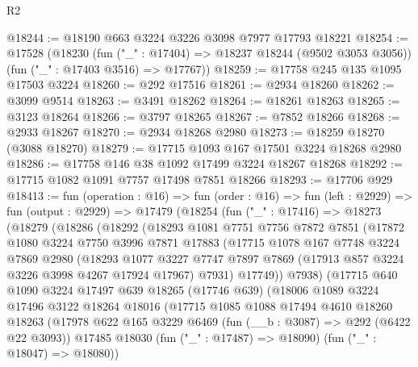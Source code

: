 \begin{lexlean}{R2}
\begin{coremodule}
@18244 := @18190 @663 @3224 @3226 @3098 @7977 @17793 @18221
@18254 := @17528
    (@18230
      (fun ("_" : @17404) => @18237 @18244 (@9502 @3053 @3056))
      (fun ("_" : @17403 @3516) => @17767))
@18259 := @17758 @245 @135 @1095 @17503 @3224
@18260 := @292 @17516
@18261 := @2934 @18260
@18262 := @3099 @9514
@18263 := @3491 @18262
@18264 := @18261 @18263
@18265 := @3123 @18264
@18266 := @3797 @18265
@18267 := @7852 @18266
@18268 := @2933 @18267
@18270 := @2934 @18268 @2980
@18273 := @18259 @18270 (@3088 @18270)
@18279 := @17715 @1093 @167 @17501 @3224 @18268 @2980
@18286 := @17758 @146 @38 @1092 @17499 @3224 @18267 @18268
@18292 := @17715 @1082 @1091 @7757 @17498 @7851 @18266
@18293 := @17706 @929
@18413 := fun (operation : @16) =>
  fun (order : @16) =>
  fun (left : @2929) =>
  fun (output : @2929) =>
  @17479
    (@18254
      (fun ("_" : @17416) =>
      @18273
        (@18279
          (@18286
            (@18292
              (@18293
                @1081
                @7751
                @7756
                @7872
                @7851
                (@17872
                  @1080
                  @3224
                  @7750
                  @3996
                  @7871
                  @17883
                  (@17715
                    @1078
                    @167
                    @7748
                    @3224
                    @7869
                    @2980
                    (@18293
                      @1077
                      @3227
                      @7747
                      @7897
                      @7869
                      (@17913 @857 @3224 @3226 @3998 @4267 @17924 @17967)
                      @7931)
                    @17749))
                @7938)
              (@17715
                @640
                @1090
                @3224
                @17497
                @639
                @18265
                (@17746 @639)
                (@18006
                  @1089
                  @3224
                  @17496
                  @3122
                  @18264
                  @18016
                  (@17715
                    @1085
                    @1088
                    @17494
                    @4610
                    @18260
                    @18263
                    (@17978
                      @622
                      @165
                      @3229
                      @6469
                      (fun (__b : @3087) => @292 (@6422 @22 @3093))
                      @17485
                      @18030
                      (fun ("_" : @17487) => @18090)
                      (fun ("_" : @18047) => @18080))

\end{coremodule}
\end{lexlean}
